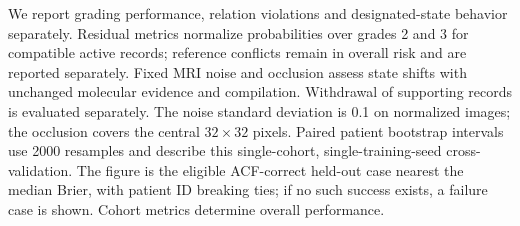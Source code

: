 {We report grading performance, relation violations and designated-state behavior separately. Residual metrics normalize probabilities over grades 2 and 3 for compatible active records; reference conflicts remain in overall risk and are reported separately. Fixed MRI noise and occlusion assess state shifts with unchanged molecular evidence and compilation. Withdrawal of supporting records is evaluated separately. The noise standard deviation is 0.1 on normalized images; the occlusion covers the central $32\times32$ pixels. Paired patient bootstrap intervals use 2000 resamples and describe this single-cohort, single-training-seed cross-validation. The figure is the eligible ACF-correct held-out case nearest the median Brier, with patient ID breaking ties; if no such success exists, a failure case is shown. Cohort metrics determine overall performance.
}
